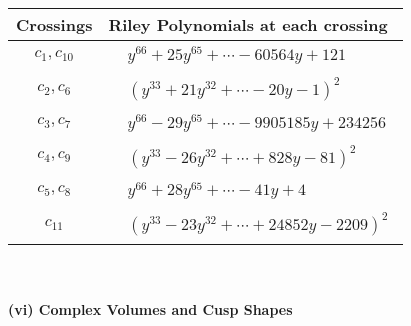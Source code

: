 \documentclass[1p]{elsarticle_modified}
\theoremstyle{definition}
\begin{document}
\begin{tabular}{m{50pt}|m{274pt}}
Crossings & \hspace{64pt}Riley Polynomials at each crossing \\
\hline $$\begin{aligned}c_{1},c_{10}\end{aligned}$$&$\begin{aligned}
&y^{66}+25 y^{65}+\cdots-60564 y+121
\end{aligned}$\\
\hline $$\begin{aligned}c_{2},c_{6}\end{aligned}$$&$\begin{aligned}
&(y^{33}+21 y^{32}+\cdots-20 y-1)^{2}
\end{aligned}$\\
\hline $$\begin{aligned}c_{3},c_{7}\end{aligned}$$&$\begin{aligned}
&y^{66}-29 y^{65}+\cdots-9905185 y+234256
\end{aligned}$\\
\hline $$\begin{aligned}c_{4},c_{9}\end{aligned}$$&$\begin{aligned}
&(y^{33}-26 y^{32}+\cdots+828 y-81)^{2}
\end{aligned}$\\
\hline $$\begin{aligned}c_{5},c_{8}\end{aligned}$$&$\begin{aligned}
&y^{66}+28 y^{65}+\cdots-41 y+4
\end{aligned}$\\
\hline $$\begin{aligned}c_{11}\end{aligned}$$&$\begin{aligned}
&(y^{33}-23 y^{32}+\cdots+24852 y-2209)^{2}
\end{aligned}$\\
\hline
\end{tabular}\\~\\
\newpage\flushleft \textbf{(vi) Complex Volumes and Cusp Shapes}
\end{document}
